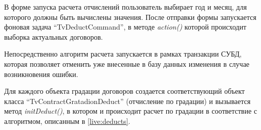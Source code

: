 В форме запуска расчета отчислений пользователь выбирает год и месяц, для которого
должны быть вычислены значения. После отправки формы запускается фоновая задача ``TvDeductCommand'',
в методе \textit{action()} которой происходит выборка актуальных договоров.

Непосредственно алгоритм расчета запускается в рамках транзакции СУБД, которая позволяет отменить уже внесенные 
в базу данных изменения в случае возникновения ошибки.

Для каждого объекта градации договоров создается соответствующий объект класса ``TvContractGratadionDeduct''
(отчисление по градации) и вызывается метод \textit{initDeduct()}, в котором и происходит расчет по градации
в соответствие с алгоритмом, описанным в \ref{live:deducts}.

